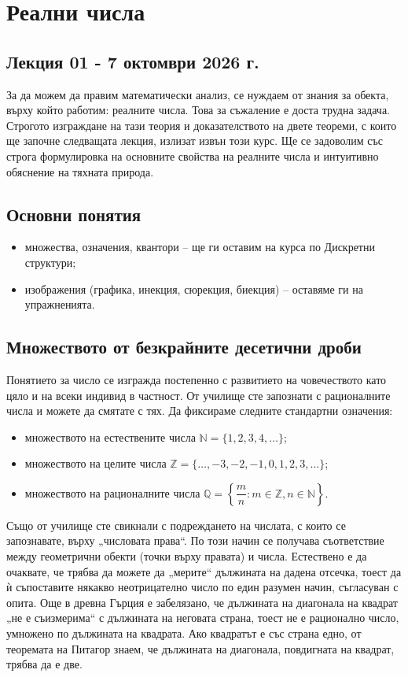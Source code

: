 \chapter{Реални числа}

\section*{Лекция 01 - 7 октомври 2026 г.}
За да можем да правим математически анализ, се нуждаем от знания за обекта, върху който работим: реалните числа. Това за съжаление е доста трудна задача. Строгото изграждане на тази теория и доказателството на двете теореми, с които ще започне следващата лекция, излизат извън този курс. Ще се задоволим със строга формулировка на основните свойства на реалните числа и интуитивно обяснение на тяхната природа.

\section{Основни понятия}

\begin{itemize}
    \item множества, означения, квантори -- ще ги оставим на курса по Дискретни структури;
    \item изображения (графика, инекция, сюрекция, биекция) -- оставяме ги на упражненията.
\end{itemize}

\section{Множеството от безкрайните десетични дроби}

Понятието за число се изгражда постепенно с развитието на човечеството като цяло и на всеки индивид в частност. От училище сте запознати с рационалните числа и можете да смятате с тях. Да фиксираме следните стандартни означения:
\begin{itemize}
    \item множеството на естествените числа $\mathbb{N} = \{1, 2, 3, 4, \dots\}$;
    \item множеството на целите числа $\mathbb{Z} = \{\dots, -3, -2, -1, 0, 1, 2, 3, \dots\}$;
    \item множеството на рационалните числа $\mathbb{Q} = \left\{ \dfrac{m}{n} : m \in \mathbb{Z}, n \in \mathbb{N} \right\}$.
\end{itemize}

Също от училище сте свикнали с подреждането на числата, с които се запознавате, върху „числовата права“. По този начин се получава съответствие между геометрични обекти (точки върху правата) и числа. Естествено е да очаквате, че трябва да можете да „мерите“ дължината на дадена отсечка, тоест да ѝ съпоставите някакво неотрицателно число по един разумен начин, съгласуван с опита. Още в древна Гърция е забелязано, че дължината на диагонала на квадрат „не е съизмерима“ с дължината на неговата страна, тоест не е рационално число, умножено по дължината на квадрата. Ако квадратът е със страна едно, от теоремата на Питагор знаем, че дължината на диагонала, повдигната на квадрат, трябва да е две.

